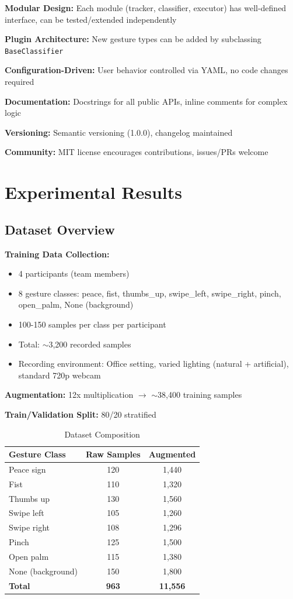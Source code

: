 \documentclass[11pt,a4paper]{article}
\begin{document}
\textbf{Modular Design:} Each module (tracker, classifier, executor) has well-defined interface, can be tested/extended independently

\textbf{Plugin Architecture:} New gesture types can be added by subclassing \texttt{BaseClassifier}

\textbf{Configuration-Driven:} User behavior controlled via YAML, no code changes required

\textbf{Documentation:} Docstrings for all public APIs, inline comments for complex logic

\textbf{Versioning:} Semantic versioning (1.0.0), changelog maintained

\textbf{Community:} MIT license encourages contributions, issues/PRs welcome

\section{Experimental Results}

\subsection{Dataset Overview}

\textbf{Training Data Collection:}
\begin{itemize}
\item 4 participants (team members)
\item 8 gesture classes: peace, fist, thumbs\_up, swipe\_left, swipe\_right, pinch, open\_palm, None (background)
\item 100-150 samples per class per participant
\item Total: $\sim$3,200 recorded samples
\item Recording environment: Office setting, varied lighting (natural + artificial), standard 720p webcam
\end{itemize}

\textbf{Augmentation:} 12x multiplication $\rightarrow$ $\sim$38,400 training samples

\textbf{Train/Validation Split:} 80/20 stratified

\begin{table}[H]
\centering
\begin{tabular}{@{}lcc@{}}
\toprule
\textbf{Gesture Class} & \textbf{Raw Samples} & \textbf{Augmented} \\
\midrule
Peace sign & 120 & 1,440 \\
Fist & 110 & 1,320 \\
Thumbs up & 130 & 1,560 \\
Swipe left & 105 & 1,260 \\
Swipe right & 108 & 1,296 \\
Pinch & 125 & 1,500 \\
Open palm & 115 & 1,380 \\
None (background) & 150 & 1,800 \\
\midrule
\textbf{Total} & \textbf{963} & \textbf{11,556} \\
\bottomrule
\end{tabular}
\caption{Dataset Composition}
\end{table}
\end{document}
